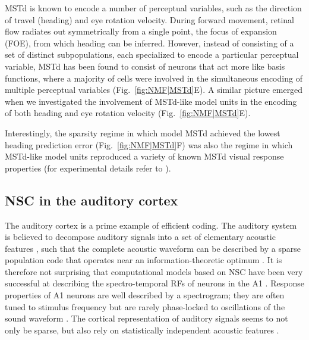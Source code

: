 \ac{MSTd} is known to encode a number of perceptual variables,
such as the direction of travel (heading) and eye rotation velocity.
During forward movement, retinal flow radiates out symmetrically from a single point,
the focus of expansion (FOE), from which heading can be inferred.
However, instead of consisting of a set of distinct subpopulations,
each specialized to encode a particular perceptual variable,
\ac{MSTd} has been found to consist of neurons that act more like basis functions,
where a majority of cells were involved in the simultaneous encoding of multiple
perceptual variables (Fig.~\ref{fig:NMF|MSTd}E).
A similar picture emerged when we investigated the involvement of \ac{MSTd}-like
model units in the encoding of both heading and eye rotation velocity
(Fig.~\ref{fig:NMF|MSTd}E).

Interestingly, the sparsity regime in which model \ac{MSTd} achieved the
lowest heading prediction error (Fig.~\ref{fig:NMF|MSTd}F) was also the
regime in which \ac{MSTd}-like model units reproduced a variety of known
\ac{MSTd} visual response properties
(for experimental details refer to \cite{Beyeler2016}).


\subsection*{NSC in the auditory cortex}

The auditory cortex is a prime example of efficient coding. The auditory system is believed to decompose auditory signals into
a set of elementary acoustic features \cite{SmithLewicki2006},
such that the complete acoustic waveform can be described by a
sparse population code that operates near an information-theoretic optimum
\cite{SmithLewicki2006,rokem2006,Hromadka2008}.
It is therefore not surprising that computational models based on \ac{NSC}
have been very successful at describing the spectro-temporal \acp{RF}
of neurons in the \ac{A1} \cite{Martinez2015,David2007}.
Response properties of \ac{A1} neurons are well described by a spectrogram;
they are often tuned to stimulus frequency but are rarely phase-locked
to oscillations of the sound waveform \cite{Leaver2010}.
The cortical representation of auditory signals seems to not only be sparse,
but also rely on statistically independent acoustic features \cite{Klein2003}.


